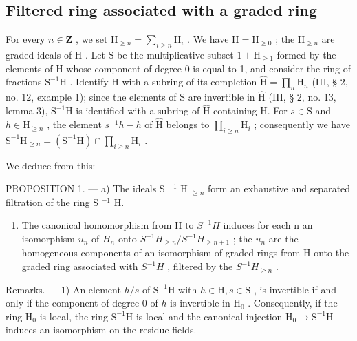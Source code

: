 \subsection{Filtered ring associated with a graded ring}

For every \(n \in \mathbf{Z}\) , we set \(\mathrm{H}_{\geqslant n} = \sum_{i \geqslant n} \mathrm{H}_i\) . We have \(\mathrm{H} = \mathrm{H}_{\geqslant 0}\) ; the \(\mathrm{H}_{\geqslant n}\) are graded ideals of \(\mathrm{H}\) . Let S be the multiplicative subset \(1 + \mathrm{H}_{\geqslant 1}\) formed by the elements of H whose component of degree 0 is equal to 1, and consider the ring of fractions \(\mathrm{S}^{-1}\mathrm{H}\) . Identify H with a subring of its completion \(\hat{\mathrm{H}} = \prod_{n} \mathrm{H}_{n}\) (III, § 2, no. 12, example 1); since the elements of S are invertible in \(\hat{\mathrm{H}}\) (III, § 2, no. 13, lemma 3), \(\mathrm{S}^{-1}\mathrm{H}\) is identified with a subring of \(\hat{\mathrm{H}}\) containing H. For \(s \in \mathrm{S}\) and \(h \in \mathrm{H}_{\geqslant n}\) , the element \(s^{-1}h - h\) of \(\hat{\mathrm{H}}\) belongs to \(\prod_{i \geqslant n} \mathrm{H}_i\) ; consequently we have \(\mathrm{S}^{-1}\mathrm{H}_{\geqslant n} = (\mathrm{S}^{-1}\mathrm{H}) \cap \prod_{i \geqslant n} \mathrm{H}_i\) .

We deduce from this:

PROPOSITION 1. --- a) The ideals S \(^{-1}\) H \(_{≥n}\) form an exhaustive and separated filtration of the ring S \(^{-1}\) H.

\begin{enumerate}
\def\labelenumi{\alph{enumi})}
\setcounter{enumi}{1}
\tightlist
\item
  The canonical homomorphism from H to \(S^{-1}H\) induces for each n an isomorphism \(u_{n}\) of \(H_{n}\) onto \(S^{-1}H_{\geqslant n}/S^{-1}H_{\geqslant n+1}\) ; the \(u_{n}\) are the homogeneous components of an isomorphism of graded rings from H onto the graded ring associated with \(S^{-1}H\) , filtered by the \(S^{-1}H_{\geqslant n}\) .
\end{enumerate}

Remarks. --- 1) An element \(h/s\) of \(\mathrm{S}^{-1}\mathrm{H}\) with \(h\in\mathrm{H}, s\in\mathrm{S}\) , is invertible if and only if the component of degree 0 of \(h\) is invertible in \(\mathrm{H}_{0}\) . Consequently, if the ring \(\mathrm{H}_{0}\) is local, the ring \(\mathrm{S}^{-1}\mathrm{H}\) is local and the canonical injection \(\mathrm{H}_{0}\to\mathrm{S}^{-1}\mathrm{H}\) induces an isomorphism on the residue fields.

